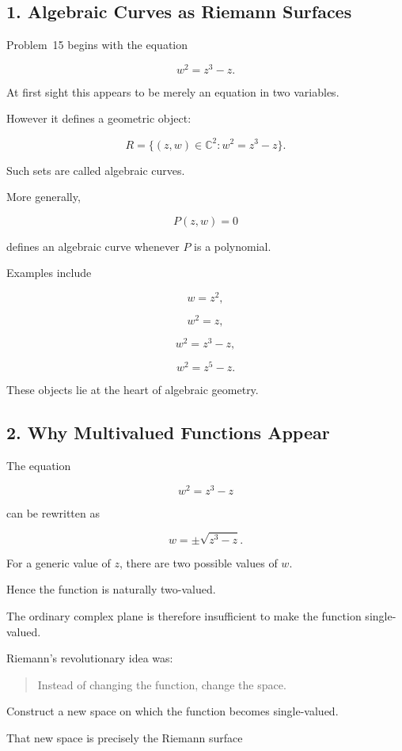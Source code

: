 \documentclass[12pt,a4paper]{article}
\theoremstyle{notespace}
\begin{document}
\subsection{1. Algebraic Curves as Riemann Surfaces}

Problem~15 begins with the equation

\[
w^2=z^3-z.
\]

At first sight this appears to be merely an equation in two variables.

However it defines a geometric object:

\[
R
=
\{(z,w)\in\mathbb C^2:w^2=z^3-z\}.
\]

Such sets are called algebraic curves.

More generally,

\[
P(z,w)=0
\]

defines an algebraic curve whenever \(P\) is a polynomial.

Examples include

\[
w=z^2,
\]

\[
w^2=z,
\]

\[
w^2=z^3-z,
\]

\[
w^2=z^5-z.
\]

These objects lie at the heart of algebraic geometry.

\bigskip

\subsection{2. Why Multivalued Functions Appear}

The equation

\[
w^2=z^3-z
\]

can be rewritten as

\[
w
=
\pm\sqrt{z^3-z}.
\]

For a generic value of \(z\), there are two possible values of \(w\).

Hence the function is naturally two-valued.

The ordinary complex plane is therefore insufficient to make the function single-valued.

Riemann's revolutionary idea was:

\begin{quote}
	Instead of changing the function, change the space.
\end{quote}

Construct a new space on which the function becomes single-valued.

That new space is precisely the Riemann surface
\end{document}
